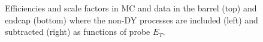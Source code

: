 \begin{figure}[bh]
\begin{center}
\begin{tabular}{cc}
    \end{tabular}
    \caption{Efficiencies and scale factors in MC and data in the barrel (top) and endcap (bottom) where the non-DY processes are included (left) and subtracted (right) as functions of probe $E_T$.}
    \label{fig:eff_SS_amcatnlo_nominal_ET_2016}
  \end{center}
\end{figure}


